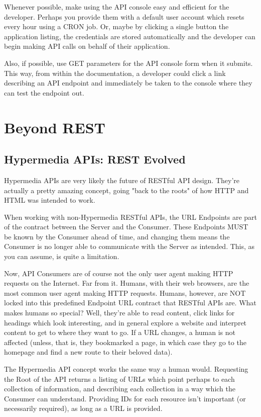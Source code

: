 \documentclass{book}
\begin{document}
Whenever possible, make using the API console easy and efficient for the developer. Perhaps you provide them with a default user account which resets every hour using a CRON job. Or, maybe by clicking a single button the application listing, the credentials are stored automatically and the developer can begin making API calls on behalf of their application.

Also, if possible, use GET parameters for the API console form when it submits. This way, from within the documentation, a developer could click a link describing an API endpoint and immediately be taken to the console where they can test the endpoint out.


\chapter{Beyond REST}

\section{Hypermedia APIs: REST Evolved}

Hypermedia APIs are very likely the future of RESTful API design. They're actually a pretty amazing concept, going "back to the roots" of how HTTP and HTML was intended to work.

When working with non-Hypermedia RESTful APIs, the URL Endpoints are part of the contract between the Server and the Consumer. These Endpoints MUST be known by the Consumer ahead of time, and changing them means the Consumer is no longer able to communicate with the Server as intended. This, as you can assume, is quite a limitation.

Now, API Consumers are of course not the only user agent making HTTP requests on the Internet. Far from it. Humans, with their web browsers, are the most common user agent making HTTP requests. Humans, however, are NOT locked into this predefined Endpoint URL contract that RESTful APIs are. What makes humans so special? Well, they're able to read content, click links for headings which look interesting, and in general explore a website and interpret content to get to where they want to go. If a URL changes, a human is not affected (unless, that is, they bookmarked a page, in which case they go to the homepage and find a new route to their beloved data).

The Hypermedia API concept works the same way a human would. Requesting the Root of the API returns a listing of URLs which point perhaps to each collection of information, and describing each collection in a way which the Consumer can understand. Providing IDs for each resource isn't important (or necessarily required), as long as a URL is provided.
\end{document}
